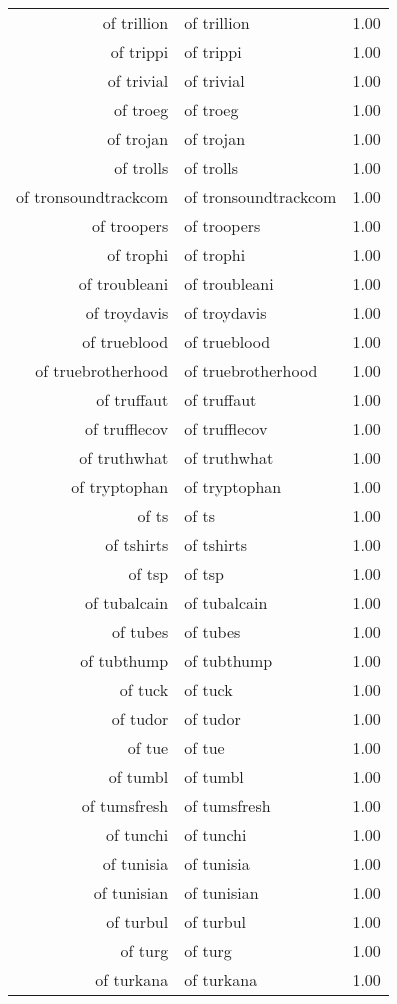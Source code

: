 \begin{table}[ht]
\begin{tabular}{rlr}
  of trillion & of trillion & 1.00 \\ 
  of trippi & of trippi & 1.00 \\ 
  of trivial & of trivial & 1.00 \\ 
  of troeg & of troeg & 1.00 \\ 
  of trojan & of trojan & 1.00 \\ 
  of trolls & of trolls & 1.00 \\ 
  of tronsoundtrackcom & of tronsoundtrackcom & 1.00 \\ 
  of troopers & of troopers & 1.00 \\ 
  of trophi & of trophi & 1.00 \\ 
  of troubleani & of troubleani & 1.00 \\ 
  of troydavis & of troydavis & 1.00 \\ 
  of trueblood & of trueblood & 1.00 \\ 
  of truebrotherhood & of truebrotherhood & 1.00 \\ 
  of truffaut & of truffaut & 1.00 \\ 
  of trufflecov & of trufflecov & 1.00 \\ 
  of truthwhat & of truthwhat & 1.00 \\ 
  of tryptophan & of tryptophan & 1.00 \\ 
  of ts & of ts & 1.00 \\ 
  of tshirts & of tshirts & 1.00 \\ 
  of tsp & of tsp & 1.00 \\ 
  of tubalcain & of tubalcain & 1.00 \\ 
  of tubes & of tubes & 1.00 \\ 
  of tubthump & of tubthump & 1.00 \\ 
  of tuck & of tuck & 1.00 \\ 
  of tudor & of tudor & 1.00 \\ 
  of tue & of tue & 1.00 \\ 
  of tumbl & of tumbl & 1.00 \\ 
  of tumsfresh & of tumsfresh & 1.00 \\ 
  of tunchi & of tunchi & 1.00 \\ 
  of tunisia & of tunisia & 1.00 \\ 
  of tunisian & of tunisian & 1.00 \\ 
  of turbul & of turbul & 1.00 \\ 
  of turg & of turg & 1.00 \\ 
  of turkana & of turkana & 1.00 \\ 

\end{tabular}
\end{table}
